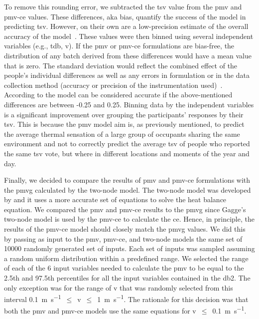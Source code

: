 To remove this rounding error, we subtracted the \ac{tsv} value from the \ac{pmv} and \ac{pmv-ce} values.
These differences, aka bias, quantify the success of the model in predicting \ac{tsv}.
However, on their own are a low-precision estimate of the overall accuracy of the model~\cite{Humphreys2002}.
These values were then binned using several independent variables (e.g., \ac{tdb}, \ac{v}).
If the \ac{pmv} or \ac{pmv-ce} formulations are bias-free, the distribution of any batch derived from these differences would have a mean value that is zero.
The standard deviation would reflect the combined effect of the people's individual differences as well as any errors in formulation or in the data collection method (accuracy or precision of the instrumentation used)~\cite{Humphreys2002}.
According to  the model can be considered accurate if the above-mentioned differences are between -0.25 and 0.25.
Binning data by the independent variables is a significant improvement over grouping the participants' responses by their \ac{tsv}.
This is because the \ac{pmv} model aim is, as previously mentioned, to predict the average thermal sensation of a large group of occupants sharing the same environment and not to correctly predict the average \ac{tsv} of people who reported the same \ac{tsv} vote, but where in different locations and moments of the year and day.

Finally, we decided to compare the results of \ac{pmv} and \ac{pmv-ce} formulations with the \ac{pmvg} calculated by the two-node model.
The two-node model was developed by  and it uses a more accurate set of equations to solve the heat balance equation.
We compared the \ac{pmv} and \ac{pmv-ce} results to the \ac{pmvg} since Gagge's two-node model is used by the \ac{pmv-ce} to calculate the \ac{ce}.
Hence, in principle, the results of the \ac{pmv-ce} model should closely match the \ac{pmvg} values.
We did this by passing as input to the \ac{pmv}, \ac{pmv-ce}, and two-node models the same set of \num{10000} randomly generated set of inputs. 
Each set of inputs was sampled assuming a random uniform distribution within a predefined range. 
We selected the range of each of the 6 input variables needed to calculate the \ac{pmv} to be equal to the 2.5th and 97.5th percentiles for all the input variables contained in the \ac{db2}.
The only exception was for the range of \ac{v} that was randomly selected from this interval \qty{0.1}{\m\per\s}~$\leq$~\ac{v}~$\leq$~\qty{1}{\m\per\s}.
The rationale for this decision was that both the \ac{pmv} and \ac{pmv-ce} models use the same equations for \ac{v}~$\leq$~\qty{0.1}{\m\per\s}.

